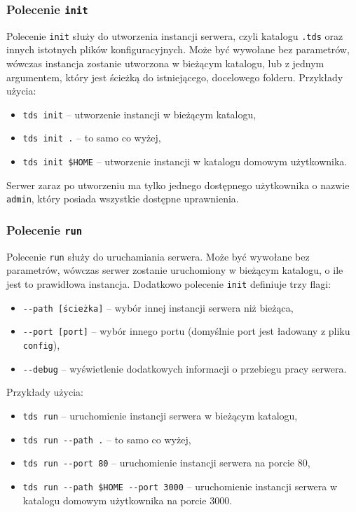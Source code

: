 \documentclass[8pt,a4paper]{article}
\begin{document}
\subsubsection{Polecenie \texttt{init}}
Polecenie \texttt{init} służy do utworzenia instancji serwera, czyli katalogu \texttt{.tds} oraz innych istotnych plików konfiguracyjnych. Może być wywołane bez parametrów, wówczas instancja zostanie utworzona w bieżącym katalogu, lub z jednym argumentem, który jest ścieżką do istniejącego, docelowego folderu. Przykłady użycia:
\begin{itemize}
    \item \texttt{tds init} -- utworzenie instancji w bieżącym katalogu,
    \item \texttt{tds init .} -- to samo co wyżej,
    \item \texttt{tds init \$HOME} -- utworzenie instancji w katalogu domowym użytkownika.
\end{itemize}
Serwer zaraz po utworzeniu ma tylko jednego dostępnego użytkownika o nazwie \texttt{admin}, który posiada wszystkie dostępne uprawnienia.

\subsubsection{Polecenie \texttt{run}}
Polecenie \texttt{run} służy do uruchamiania serwera. Może być wywołane bez parametrów, wówczas serwer zostanie uruchomiony w bieżącym katalogu, o ile jest to prawidłowa instancja. Dodatkowo polecenie \texttt{init} definiuje trzy flagi:

\begin{itemize}
    \item \texttt{-{}-path [ścieżka]} -- wybór innej instancji serwera niż bieżąca,
    \item \texttt{-{}-port [port]} -- wybór innego portu (domyślnie port jest ładowany z pliku \texttt{config}),
    \item \texttt{-{}-debug} -- wyświetlenie dodatkowych informacji o przebiegu pracy serwera.
\end{itemize}

\noindent Przykłady użycia:

\begin{itemize}
    \item \texttt{tds run} -- uruchomienie instancji serwera w bieżącym katalogu,
    \item \texttt{tds run -{}-path .} -- to samo co wyżej,
    \item \texttt{tds run -{}-port 80} -- uruchomienie instancji serwera na porcie 80,
    \item \texttt{tds run -{}-path \$HOME -{}-port 3000} -- uruchomienie instancji serwera w katalogu domowym użytkownika na porcie 3000.
\end{itemize}
\end{document}
